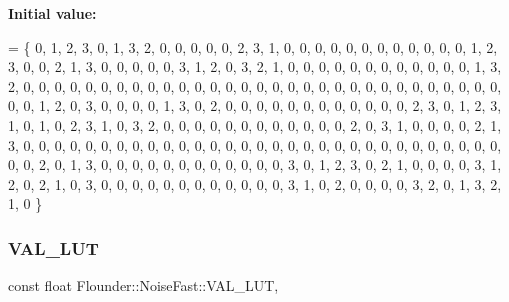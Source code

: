 {\bfseries Initial value\+:}
\begin{DoxyCode}
=
    \{
        0, 1, 2, 3, 0, 1, 3, 2, 0, 0, 0, 0, 0, 2, 3, 1, 0, 0, 0, 0, 0, 0, 0, 0, 0, 0, 0, 0, 1, 2, 3, 0,
        0, 2, 1, 3, 0, 0, 0, 0, 0, 3, 1, 2, 0, 3, 2, 1, 0, 0, 0, 0, 0, 0, 0, 0, 0, 0, 0, 0, 1, 3, 2, 0,
        0, 0, 0, 0, 0, 0, 0, 0, 0, 0, 0, 0, 0, 0, 0, 0, 0, 0, 0, 0, 0, 0, 0, 0, 0, 0, 0, 0, 0, 0, 0, 0,
        1, 2, 0, 3, 0, 0, 0, 0, 1, 3, 0, 2, 0, 0, 0, 0, 0, 0, 0, 0, 0, 0, 0, 0, 2, 3, 0, 1, 2, 3, 1, 0,
        1, 0, 2, 3, 1, 0, 3, 2, 0, 0, 0, 0, 0, 0, 0, 0, 0, 0, 0, 0, 2, 0, 3, 1, 0, 0, 0, 0, 2, 1, 3, 0,
        0, 0, 0, 0, 0, 0, 0, 0, 0, 0, 0, 0, 0, 0, 0, 0, 0, 0, 0, 0, 0, 0, 0, 0, 0, 0, 0, 0, 0, 0, 0, 0,
        2, 0, 1, 3, 0, 0, 0, 0, 0, 0, 0, 0, 0, 0, 0, 0, 3, 0, 1, 2, 3, 0, 2, 1, 0, 0, 0, 0, 3, 1, 2, 0,
        2, 1, 0, 3, 0, 0, 0, 0, 0, 0, 0, 0, 0, 0, 0, 0, 3, 1, 0, 2, 0, 0, 0, 0, 3, 2, 0, 1, 3, 2, 1, 0
    \}
\end{DoxyCode}
\mbox{\label{class_flounder_1_1_noise_fast_aa418f8dbd582e25b234198d015201d2a}} 
\subsubsection{\texorpdfstring{V\+A\+L\+\_\+\+L\+UT}{VAL\_LUT}}
{\footnotesize\ttfamily const float Flounder\+::\+Noise\+Fast\+::\+V\+A\+L\+\_\+\+L\+UT\hspace{0.3cm}{\ttfamily [static]}, {\ttfamily [private]}}

